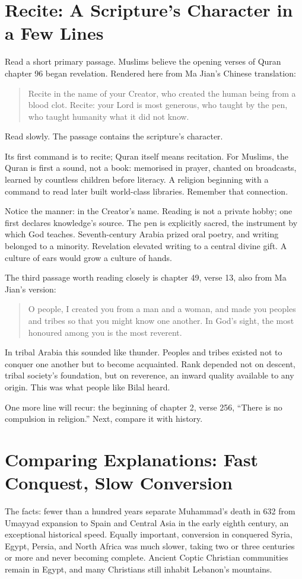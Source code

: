 \section[Recite: Scripture in a Few Lines]{Recite: A Scripture's Character in a Few Lines}
Read a short primary passage. Muslims believe the opening verses of Quran chapter 96 began revelation. Rendered here from Ma Jian's Chinese translation:

\begin{quote}
Recite in the name of your Creator, who created the human being from a blood clot. Recite: your Lord is most generous, who taught by the pen, who taught humanity what it did not know.
\end{quote}
Read slowly. The passage contains the scripture's character.

Its first command is to recite; Quran itself means recitation. For Muslims, the Quran is first a sound, not a book: memorised in prayer, chanted on broadcasts, learned by countless children before literacy. A religion beginning with a command to read later built world-class libraries. Remember that connection.

Notice the manner: in the Creator's name. Reading is not a private hobby; one first declares knowledge's source. The pen is explicitly sacred, the instrument by which God teaches. Seventh-century Arabia prized oral poetry, and writing belonged to a minority. Revelation elevated writing to a central divine gift. A culture of ears would grow a culture of hands.

The third passage worth reading closely is chapter 49, verse 13, also from Ma Jian's version:

\begin{quote}
O people, I created you from a man and a woman, and made you peoples and tribes so that you might know one another. In God's sight, the most honoured among you is the most reverent.
\end{quote}
In tribal Arabia this sounded like thunder. Peoples and tribes existed not to conquer one another but to become acquainted. Rank depended not on descent, tribal society's foundation, but on reverence, an inward quality available to any origin. This was what people like Bilal heard.

One more line will recur: the beginning of chapter 2, verse 256, ``There is no compulsion in religion.'' Next, compare it with history.

\section[Fast Conquest, Slow Conversion]{Comparing Explanations: Fast Conquest, Slow Conversion}
The facts: fewer than a hundred years separate Muhammad's death in 632 from Umayyad expansion to Spain and Central Asia in the early eighth century, an exceptional historical speed. Equally important, conversion in conquered Syria, Egypt, Persia, and North Africa was much slower, taking two or three centuries or more and never becoming complete. Ancient Coptic Christian communities remain in Egypt, and many Christians still inhabit Lebanon's mountains.


